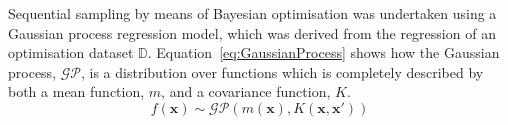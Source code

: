  



Sequential sampling by means of Bayesian optimisation was undertaken using
 a Gaussian process regression model, which was derived from the regression
 of an optimisation dataset \(\mathbb{D}\).
Equation~\ref{eq:GaussianProcess} shows how the Gaussian process,
 \(\mathcal{GP}\), is a distribution over functions which is completely
 described by both a mean function, \(m\), and a covariance function, \(K\).
\begin{equation}\label{eq:GaussianProcess}
    f(\mathbf{x})\sim \mathcal{GP}(m(\mathbf{x}),K(\mathbf{x},\mathbf{x}'))
\end{equation}

